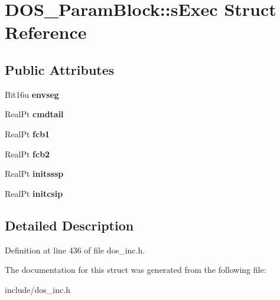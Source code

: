 \hypertarget{structDOS__ParamBlock_1_1sExec}{\section{D\-O\-S\-\_\-\-Param\-Block\-:\-:s\-Exec Struct Reference}
\label{structDOS__ParamBlock_1_1sExec}
}
\subsection*{Public Attributes}
\begin{DoxyCompactItemize}
\item 
\hypertarget{structDOS__ParamBlock_1_1sExec_ab687ac3ee3f86582a88216f428b86770}{Bit16u {\bfseries envseg}}\label{structDOS__ParamBlock_1_1sExec_ab687ac3ee3f86582a88216f428b86770}

\item 
\hypertarget{structDOS__ParamBlock_1_1sExec_ab6b6951382774b8c938f9428192c529d}{Real\-Pt {\bfseries cmdtail}}\label{structDOS__ParamBlock_1_1sExec_ab6b6951382774b8c938f9428192c529d}

\item 
\hypertarget{structDOS__ParamBlock_1_1sExec_a90a2f5095e246afb9c22e59625d47637}{Real\-Pt {\bfseries fcb1}}\label{structDOS__ParamBlock_1_1sExec_a90a2f5095e246afb9c22e59625d47637}

\item 
\hypertarget{structDOS__ParamBlock_1_1sExec_a07ee173102f3e88504b4c76674174243}{Real\-Pt {\bfseries fcb2}}\label{structDOS__ParamBlock_1_1sExec_a07ee173102f3e88504b4c76674174243}

\item 
\hypertarget{structDOS__ParamBlock_1_1sExec_a0541b0ed955144e206155d01815ab077}{Real\-Pt {\bfseries initsssp}}\label{structDOS__ParamBlock_1_1sExec_a0541b0ed955144e206155d01815ab077}

\item 
\hypertarget{structDOS__ParamBlock_1_1sExec_a9fd385a207f3887bc6e26973d2b11e8f}{Real\-Pt {\bfseries initcsip}}\label{structDOS__ParamBlock_1_1sExec_a9fd385a207f3887bc6e26973d2b11e8f}

\end{DoxyCompactItemize}


\subsection{Detailed Description}


Definition at line 436 of file dos\-\_\-inc.\-h.



The documentation for this struct was generated from the following file\-:\begin{DoxyCompactItemize}
\item 
include/dos\-\_\-inc.\-h\end{DoxyCompactItemize}
